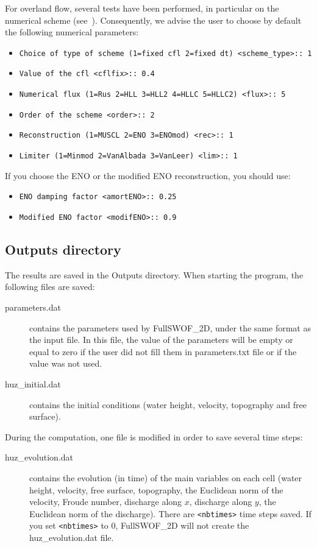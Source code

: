 \documentclass[a4paper, 11pt]{article}
\newcommand{\FullSWOF}{FullSWOF\_2D}
\begin{document}
For overland flow, several tests have been performed, in particular on the numerical scheme (see~\citet{Delestre10b}).
Consequently, we advise the user to choose by default the following numerical parameters:
\begin{itemize}
	\item \texttt{Choice of type of scheme (1=fixed cfl  2=fixed dt) <scheme\_type>:: 1}
	\item \texttt{Value of the cfl  <cflfix>:: 0.4}
	\item \texttt{Numerical flux (1=Rus 2=HLL 3=HLL2 4=HLLC 5=HLLC2) <flux>:: 5}
	\item \texttt{Order of the scheme <order>:: 2}
	\item \texttt{Reconstruction (1=MUSCL 2=ENO 3=ENOmod) <rec>:: 1}
	\item \texttt{Limiter (1=Minmod 2=VanAlbada 3=VanLeer) <lim>:: 1}
\end{itemize}

\medskip

If you choose the ENO or the modified ENO reconstruction, you should use:
\begin{itemize}
	\item \texttt{ENO damping factor <amortENO>:: 0.25}
	\item \texttt{Modified ENO factor <modifENO>:: 0.9}
\end{itemize}

\subsection{\textsf{Outputs} directory}\label{sec:outputs}

The results are saved in the \textsf{Outputs} directory.
When starting the program, the following files are saved:
\begin{description}
	\item[\textsf{parameters.dat}] contains the parameters used by \FullSWOF, under the same format as the input file.
	      In this file, the value of the parameters will be empty or equal to zero if the user did not fill them in \textsf{parameters.txt} file or if the value was not used.
	\item[\textsf{huz\_initial.dat}] contains the initial conditions (water height, velocity, topography and free surface).
\end{description}
During the computation, one file is modified in order to save several time steps:
\begin{description}
	\item[\textsf{huz\_evolution.dat}] contains the evolution (in time) of the main variables on each cell (water height, velocity, free surface, topography, the Euclidean norm of the velocity, Froude number, discharge along \(x\), discharge along \(y\), the Euclidean norm of the discharge).
	      There are \texttt{<nbtimes>} time steps saved.\newline
	      If you set \texttt{<nbtimes>} to 0, \FullSWOF{} will not create the \textsf{huz\_evolution.dat} file.
\end{description}
\end{document}
